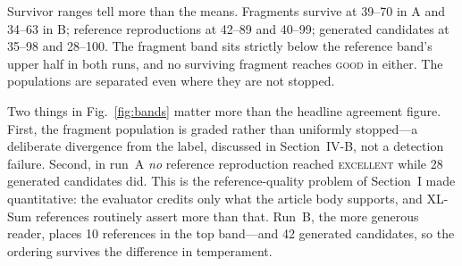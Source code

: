 \documentclass[conference]{IEEEtran}
\begin{document}
Survivor ranges tell more than the means. Fragments survive at 39--70 in
A and 34--63 in B; reference reproductions at 42--89 and 40--99;
generated candidates at 35--98 and 28--100. The fragment band sits
strictly below the reference band's upper half in both runs, and no
surviving fragment reaches \textsc{good} in either. The populations are
separated even where they are not stopped.

Two things in Fig.~\ref{fig:bands} matter more than the headline
agreement figure. First, the fragment population is graded rather than
uniformly stopped---a deliberate divergence from the label, discussed in
Section~IV-B, not a detection failure. Second, in run~A \emph{no}
reference reproduction reached \textsc{excellent} while 28 generated
candidates did. This is the reference-quality problem of Section~I made
quantitative: the evaluator credits only what the article body supports,
and XL-Sum references routinely assert more than that. Run~B, the more
generous reader, places 10 references in the top band---and 42
generated candidates, so the ordering survives the difference in
temperament.
\end{document}
